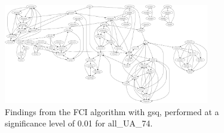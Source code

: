 \begin{figure}[htbp]
    \centering
    \includegraphics[width=0.8\textwidth]{Report/final_report/pictures/FCI_gsq_0.01_all_UA_74.png}
    \caption{Findings from the FCI algorithm with gsq, performed at a significance level of 0.01 for all_UA_74.}
    \label{fig:fci_gsq_0.01all_UA_74}
\end{figure}
